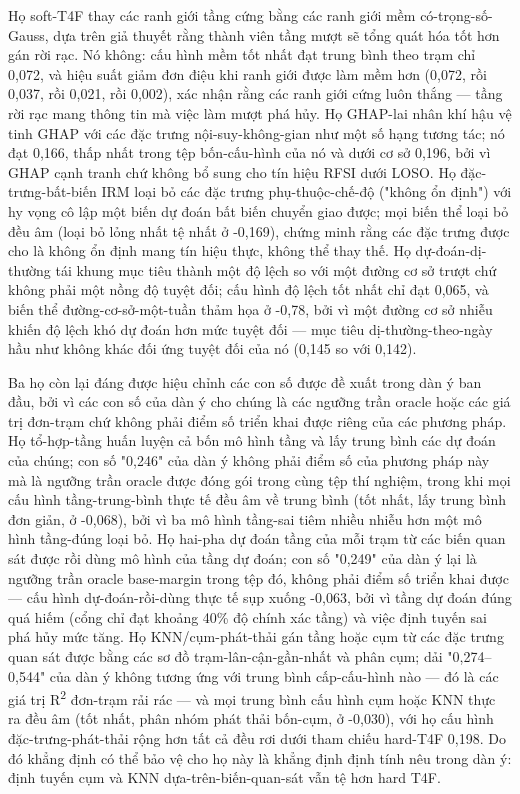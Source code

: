 Họ soft-T4F thay các ranh giới tầng cứng bằng các ranh giới mềm có-trọng-số-Gauss, dựa trên giả thuyết rằng thành viên tầng mượt sẽ tổng quát hóa tốt hơn gán rời rạc. Nó không: cấu hình mềm tốt nhất đạt trung bình theo trạm chỉ 0,072, và hiệu suất giảm đơn điệu khi ranh giới được làm mềm hơn (0,072, rồi 0,037, rồi 0,021, rồi 0,002), xác nhận rằng các ranh giới cứng luôn thắng --- tầng rời rạc mang thông tin mà việc làm mượt phá hủy. Họ GHAP-lai nhân khí hậu vệ tinh GHAP với các đặc trưng nội-suy-không-gian như một số hạng tương tác; nó đạt 0,166, thấp nhất trong tệp bốn-cấu-hình của nó và dưới cơ sở 0,196, bởi vì GHAP cạnh tranh chứ không bổ sung cho tín hiệu RFSI dưới LOSO. Họ đặc-trưng-bất-biến IRM loại bỏ các đặc trưng phụ-thuộc-chế-độ ("không ổn định") với hy vọng cô lập một biến dự đoán bất biến chuyển giao được; mọi biến thể loại bỏ đều âm (loại bỏ lỏng nhất tệ nhất ở -0,169), chứng minh rằng các đặc trưng được cho là không ổn định mang tín hiệu thực, không thể thay thế. Họ dự-đoán-dị-thường tái khung mục tiêu thành một độ lệch so với một đường cơ sở trượt chứ không phải một nồng độ tuyệt đối; cấu hình độ lệch tốt nhất chỉ đạt 0,065, và biến thể đường-cơ-sở-một-tuần thảm họa ở -0,78, bởi vì một đường cơ sở nhiễu khiến độ lệch khó dự đoán hơn mức tuyệt đối --- mục tiêu dị-thường-theo-ngày hầu như không khác đối ứng tuyệt đối của nó (0,145 so với 0,142).

Ba họ còn lại đáng được hiệu chỉnh các con số được đề xuất trong dàn ý ban đầu, bởi vì các con số của dàn ý cho chúng là các ngưỡng trần oracle hoặc các giá trị đơn-trạm chứ không phải điểm số triển khai được riêng của các phương pháp. Họ tổ-hợp-tầng huấn luyện cả bốn mô hình tầng và lấy trung bình các dự đoán của chúng; con số "0,246" của dàn ý không phải điểm số của phương pháp này mà là ngưỡng trần oracle được đóng gói trong cùng tệp thí nghiệm, trong khi mọi cấu hình tầng-trung-bình thực tế đều âm về trung bình (tốt nhất, lấy trung bình đơn giản, ở -0,068), bởi vì ba mô hình tầng-sai tiêm nhiều nhiễu hơn một mô hình tầng-đúng loại bỏ. Họ hai-pha dự đoán tầng của mỗi trạm từ các biến quan sát được rồi dùng mô hình của tầng dự đoán; con số "0,249" của dàn ý lại là ngưỡng trần oracle base-margin trong tệp đó, không phải điểm số triển khai được --- cấu hình dự-đoán-rồi-dùng thực tế sụp xuống -0,063, bởi vì tầng dự đoán đúng quá hiếm (cổng chỉ đạt khoảng 40\% độ chính xác tầng) và việc định tuyến sai phá hủy mức tăng. Họ KNN/cụm-phát-thải gán tầng hoặc cụm từ các đặc trưng quan sát được bằng các sơ đồ trạm-lân-cận-gần-nhất và phân cụm; dải "0,274--0,544" của dàn ý không tương ứng với trung bình cấp-cấu-hình nào --- đó là các giá trị R\textsuperscript{2} đơn-trạm rải rác --- và mọi trung bình cấu hình cụm hoặc KNN thực ra đều âm (tốt nhất, phân nhóm phát thải bốn-cụm, ở -0,030), với họ cấu hình đặc-trưng-phát-thải rộng hơn tất cả đều rơi dưới tham chiếu hard-T4F 0,198. Do đó khẳng định có thể bảo vệ cho họ này là khẳng định định tính nêu trong dàn ý: định tuyến cụm và KNN dựa-trên-biến-quan-sát vẫn tệ hơn hard T4F.

